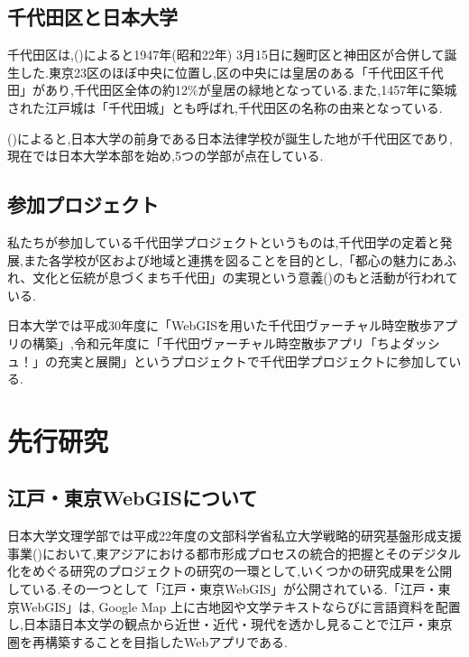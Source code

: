 \documentclass[a4paper, twoside]{jarticle}
\begin{document}
\begin{multicols}{2}
\subsection{千代田区と日本大学}
千代田区は,(\cite{digi1})によると1947年(昭和22年) 3月15日に麹町区と神田区が合併して誕生した.東京23区のほぼ中央に位置し,区の中央には皇居のある「千代田区千代田」があり,千代田区全体の約12\%が皇居の緑地となっている.また,1457年に築城された江戸城は「千代田城」とも呼ばれ,千代田区の名称の由来となっている.\par
(\cite{digi2})によると,日本大学の前身である日本法律学校が誕生した地が千代田区であり,現在では日本大学本部を始め,5つの学部が点在している.

\subsection{参加プロジェクト}
私たちが参加している千代田学プロジェクトというものは,千代田学の定着と発展,また各学校が区および地域と連携を図ることを目的とし,「都心の魅力にあふれ、文化と伝統が息づくまち千代田」の実現という意義(\cite{chiyopro})のもと活動が行われている.\par
日本大学では平成30年度に「WebGISを用いた千代田ヴァーチャル時空散歩アプリの構築」,令和元年度に「千代田ヴァーチャル時空散歩アプリ「ちよダッシュ！」の充実と展開」というプロジェクトで千代田学プロジェクトに参加している.


\section{先行研究}


\subsection{江戸・東京WebGISについて}
日本大学文理学部では平成22年度の文部科学省私立大学戦略的研究基盤形成支援事業(\cite{monka})において,東アジアにおける都市形成プロセスの統合的把握とそのデジタル化をめぐる研究のプロジェクトの研究の一環として,いくつかの研究成果を公開している.その一つとして「江戸・東京WebGIS」が公開されている.「江戸・東京WebGIS」は, Google Map 上に古地図や文学テキストならびに言語資料を配置し,日本語日本文学の観点から近世・近代・現代を透かし見ることで江戸・東京圏を再構築することを目指したWebアプリである.


\end{multicols}
\end{document}
